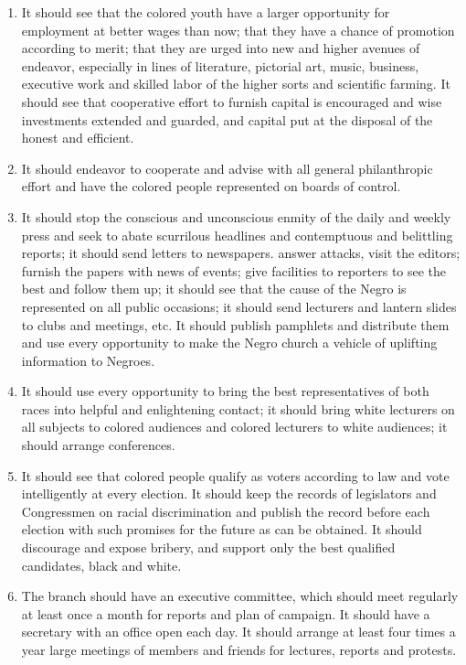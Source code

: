 \documentclass[letterpaper,10pt,english]{jupyterBook}
\begin{document}
\begin{enumerate}
\item {} 
\sphinxAtStartPar
{} It should see that the colored youth have a larger opportunity for employment at better wages than now; that they have a chance of promotion according to merit; that they are urged into new and higher avenues of endeavor, especially in lines of literature, pictorial art, music, business, executive work and skilled labor of the higher sorts and scientific farming.
It should see that co\sphinxhyphen{}operative effort to furnish capital is encouraged and wise investments extended and guarded, and capital put at the disposal of the honest and efficient.

\item {} 
\sphinxAtStartPar
{} It should endeavor to co\sphinxhyphen{}operate and advise with all general philanthropic effort and have the colored people represented on boards of control.

\item {} 
\sphinxAtStartPar
{} It should stop the conscious and unconscious enmity of the daily and weekly press and seek to abate scurrilous headlines and contemptuous and belittling reports; it should send letters to newspapers. answer attacks, visit the editors; furnish the papers with news of events; give facilities to reporters to see the best and follow them up; it should see that the cause of the Negro is represented on all public occasions; it should send lecturers and lantern slides to clubs and meetings, etc.
It should publish pamphlets and distribute them and use every opportunity to make the Negro church a vehicle of uplifting information to Negroes.

\item {} 
\sphinxAtStartPar
{} It should use every opportunity to bring the best representatives of both races into helpful and enlightening contact; it should bring white lecturers on all subjects to colored audiences and colored lecturers to white audiences; it should arrange conferences.

\item {} 
\sphinxAtStartPar
{} It should see that colored people qualify as voters according to law and vote intelligently at every election. It should keep the records of legislators and Congressmen on racial discrimination and publish the record before each election with such promises for the future as can be obtained. It should discourage and expose bribery, and support only the best qualified candidates, black and white.

\item {} 
\sphinxAtStartPar
{} The branch should have an executive committee, which should meet regularly at least once a month for reports and plan of campaign. It should have a secretary with an office open each day. It should arrange at least four times a year large meetings of members and friends for lectures, reports and protests.

\end{enumerate}
\end{document}
